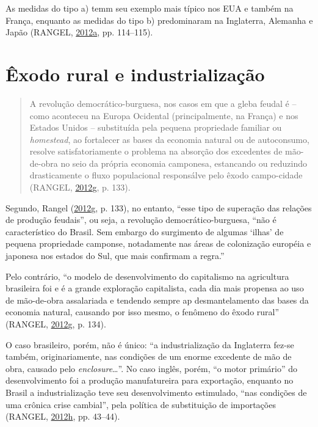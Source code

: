 \documentclass[a4paper, 12pt]{article}
\begin{document}
As medidas do tipo a) temm seu exemplo mais típico nos EUA e também na
França, enquanto as medidas do tipo b) predominaram na Inglaterra,
Alemanha e Japão (RANGEL,
\protect\hyperlink{ref-rangel1954}{2012}\protect\hyperlink{ref-rangel1954}{a},
pp. 114--115).

\hypertarget{exodo-rural-e-industrializacao}{%
\section{Êxodo rural e
industrialização}\label{exodo-rural-e-industrializacao}}

\begin{quote}
A revolução democrático-burguesa, nos casos em que a gleba feudal é --
como aconteceu na Europa Ocidental (principalmente, na França) e nos
Estados Unidos -- substituída pela pequena propriedade familiar ou
\emph{homestead}, ao fortalecer as bases da economia natural ou de
autoconsumo, resolve satisfatoriamente o problema na absorção dos
excedentes de mão-de-obra no seio da própria economia camponesa,
estancando ou reduzindo drasticamente o fluxo populacional responsálve
pelo êxodo campo-cidade (RANGEL,
\protect\hyperlink{ref-rangel1986b}{2012}\protect\hyperlink{ref-rangel1986b}{g},
p. 133).
\end{quote}

Segundo, Rangel
(\protect\hyperlink{ref-rangel1986b}{2012}\protect\hyperlink{ref-rangel1986b}{g},
p. 133), no entanto, ``esse tipo de superação das relações de produção
feudais'', ou seja, a revolução democrático-burguesa, ``não é
característico do Brasil. Sem embargo do surgimento de algumas `ilhas'
de pequena propriedade camponse, notadamente nas áreas de colonização
européia e japonesa nos estados do Sul, que mais confirmam a regra.''

Pelo contrário, ``o modelo de desenvolvimento do capitalismo na
agricultura brasileira foi e é a grande exploração capitalista, cada dia
mais propensa ao uso de mão-de-obra assalariada e tendendo sempre ap
desmantelamento das bases da economia natural, causando por isso mesmo,
o fenômeno do êxodo rural'' (RANGEL,
\protect\hyperlink{ref-rangel1986b}{2012}\protect\hyperlink{ref-rangel1986b}{g},
p. 134).

O caso brasileiro, porém, não é único: ``a industrialização da
Inglaterra fez-se também, originariamente, nas condições de um enorme
excedente de mão de obra, causado pelo \emph{enclosure}\ldots{}''. No
caso inglês, porém, ``o motor primário'' do desenvolvimento foi a
produção manufatureira para exportação, enquanto no Brasil a
industrialização teve seu desenvolvimento estimulado, ``nas condições de
uma crônica crise cambial'', pela política de substituição de
importações (RANGEL,
\protect\hyperlink{ref-rangel1962}{2012}\protect\hyperlink{ref-rangel1962}{h},
pp. 43--44).
\end{document}

